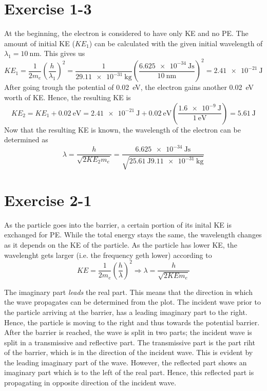 \section{Exercise 1-3}
At the beginning, the electron is considered to have only KE and no PE. The
amount of initial KE ($KE_1$) can be calculated with the given initial
wavelength of $\lambda_1 = \SI{10}{\nano\meter}$. This gives us
\[
	KE_1
	= \frac{1}{2 m_e} \left(\frac{h}{\lambda_1}\right)^2
	= \frac{1}{2 \SI{9.11e-31}{\kg}} \left(\frac{\SI{6.625e-34}{\joule\second}}{\SI{10}{\nano\meter}}\right)^2
	= \SI{2.41e-21}{\joule}
\]
After going trough the potential of \SI{0.02}{\eV}, the electron gains
another \SI{0.02}{\eV} worth of KE. Hence, the resulting KE is
\[
	KE_2
	= KE_1 + \SI{0.02}{\eV}
	= \SI{2.41e-21}{\joule} + \SI{0.02}{\eV}\left(\frac{\SI{1.6e-9}{\joule}}{\SI{1}{\eV}}\right)
	= \SI{5.61}{\joule}
\]
Now that the resulting KE is known, the wavelength of the electron can be
determined as
\[
	\lambda
	= \frac{h}{\sqrt{2 KE_2 m_e}}
	= \frac{\SI{6.625e-34}{\joule\second}}{\sqrt{2 \SI{5.61}{\joule} \SI{9.11e-31}{\kg}}}
\]



\section{Exercise 2-1}
As the particle goes into the barrier, a certain portion of its inital KE
is exchanged for PE. While the total energy stays the same, the wavelength
changes as it depends on the KE of the particle. As the particle has lower
KE, the wavelenght gets larger (i.e. the frequency geth lower) according to
\[
	KE = \frac{1}{2 m_e} \left(\frac{h}{\lambda}\right)^2
	\Rightarrow
	\lambda = \frac{h}{\sqrt{2 KE m_e}}
\]

The imaginary part \emph{leads} the real part. This means that the direction
in which the wave propagates can be determined from the plot. The incident
wave prior to the particle arriving at the barrier, has a leading imaginary
part to the right. Hence, the particle is moving to the right and thus
towards the potential barrier. After the barrier is reached, the wave is
split in two parts; the incident wave is split in a transmissive and
reflective part. The transmissive part is the part riht of the barrier, which
is in the direction of the incident wave. This is evident by the leading
imaginary part of the wave. However, the reflected part shows an imaginary
part which is to the left of the real part. Hence, this reflected part is
propagating in opposite direction of the incident wave.

